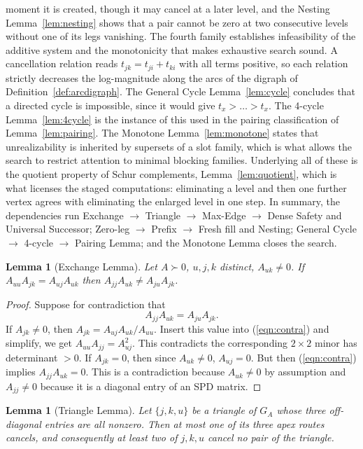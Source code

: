 \documentclass[11pt]{article}
\theoremstyle{plain}
\newtheorem{lemma}[theorem]{Lemma}
\theoremstyle{definition}
\theoremstyle{remark}
\begin{document}
\begin{humanblock}
moment it is created, though it may cancel at a later level, and the Nesting Lemma~\ref{lem:nesting} shows that a pair cannot be zero at two consecutive levels without one of its legs vanishing. The fourth family establishes infeasibility of the additive system and the monotonicity that makes exhaustive search sound. A cancellation relation reads $t_{jk}=t_{ji}+t_{ki}$ with all terms positive, so each relation strictly decreases the log-magnitude along the arcs of the digraph of Definition~\ref{def:arcdigraph}. The General Cycle Lemma~\ref{lem:cycle} concludes that a directed cycle is impossible, since it would give $t_x>\dots>t_x$. The 4-cycle Lemma~\ref{lem:4cycle} is the instance of this used in the pairing classification of Lemma~\ref{lem:pairing}. The Monotone Lemma~\ref{lem:monotone} states that unrealizability is inherited by supersets of a slot family, which is what allows the search to restrict attention to minimal blocking families. Underlying all of these is the quotient property of Schur complements, Lemma~\ref{lem:quotient}, which is what licenses the staged computations: eliminating a level and then one further vertex agrees with eliminating the enlarged level in one step. In summary, the dependencies run Exchange $\to$ Triangle $\to$ Max-Edge $\to$ Dense Safety and Universal Successor; Zero-leg $\to$ Prefix $\to$ Fresh fill and Nesting; General Cycle $\to$ 4-cycle $\to$ Pairing Lemma; and the Monotone Lemma closes the search.

\begin{lemma}[Exchange Lemma]\label{lem:exchange}
Let $A\succ0$, $u,j,k$ distinct, $A_{uk}\neq0$. If $A_{uu}A_{jk}=A_{uj}A_{uk}$ then $A_{jj}A_{uk}\neq A_{ju}A_{jk}$.
\end{lemma}
\begin{proof}
Suppose for contradiction that
\begin{equation}\label{eqn:contra}
A_{jj}A_{uk} = A_{ju}A_{jk}.
\end{equation}
If $A_{jk}\neq0$, then $A_{jk}=A_{uj}A_{uk}/A_{uu}$. Insert this value into (\ref{eqn:contra}) and simplify, we get $A_{uu}A_{jj}=A_{uj}^2$. This contradicts the corresponding $2\times2$ minor has determinant $>0$. If $A_{jk}=0$, then since $A_{uk}\neq 0$, $A_{uj}=0$. But then (\ref{eqn:contra}) implies $A_{jj}A_{uk}=0$. This is a contradiction because $A_{uk}\neq 0$ by assumption and $A_{jj}\neq 0$ because it is a diagonal entry of an SPD matrix.
\end{proof}

\begin{lemma}[Triangle Lemma]\label{lem:tri}
Let $\{j,k,u\}$ be a triangle of $G_A$ whose three off-diagonal entries are all nonzero. Then at most
one of its three apex routes cancels, and consequently at least two of $j,k,u$ cancel no pair of the
triangle.
\end{lemma}


\end{humanblock}
\end{document}

